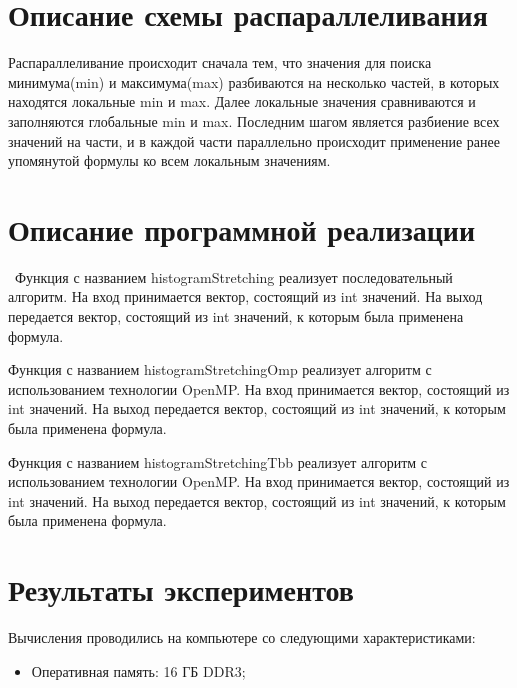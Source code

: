 \documentclass{report}
\begin{document}
\section*{Описание схемы распараллеливания}
Распараллеливание происходит сначала тем, что значения для поиска минимума(min) и максимума(max) разбиваются на несколько частей, в которых находятся локальные min и max. Далее локальные значения сравниваются и заполняются глобальные min и max. Последним шагом является разбиение всех значений на части, и в каждой части параллельно происходит применение ранее упомянутой формулы ко всем локальным значениям.
\newpage

\section*{Описание программной реализации}
\
Функция с названием histogramStretching реализует последовательный алгоритм. На вход принимается вектор, состоящий из int значений. На выход передается вектор, состоящий из int значений, к которым была применена формула.
\par Функция с названием histogramStretchingOmp реализует алгоритм с использованием технологии OpenMP. На вход принимается вектор, состоящий из int значений. На выход передается вектор, состоящий из int значений, к которым была применена формула.
\par Функция с названием histogramStretchingTbb реализует алгоритм с использованием технологии OpenMP. На вход принимается вектор, состоящий из int значений. На выход передается вектор, состоящий из int значений, к которым была применена формула.
\newpage

\section*{Результаты экспериментов}
Вычисления проводились на компьютере со следующими характеристиками:

\begin{itemize}
 Intel® Xeon® E5-1650 12 МБ кэш-памяти, 3,20 ГГц, количество ядер: 6, количество потоков: 12
\item Оперативная память: 16 ГБ DDR3;
\end{itemize}
\end{document}
